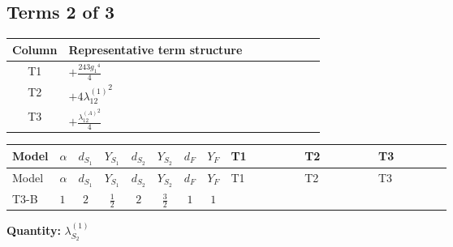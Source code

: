 \documentclass[8pt]{article}
\begin{document}
\begin{landscape}
\subsection*{Terms 2 of 3}
\begin{center}
\begin{tabular}{@{}c >{\raggedright\arraybackslash}p{0.82\linewidth}@{}}
\toprule
Column & Representative term structure \\
\midrule
T1 & \(\displaystyle +\frac{243 {g_1}^4}{4}\) \\
\midrule
T2 & \(\displaystyle +4 {\lambda_{12}^{(1)}}^2\) \\
\midrule
T3 & \(\displaystyle +\frac{{\lambda_{12}^{(A)}}^2}{4}\) \\
\midrule
\bottomrule
\end{tabular}
\end{center}
\smallskip
\tiny
\begin{longtable}{@{}llcccccc >{\raggedright\arraybackslash}p{0.21\linewidth} >{\raggedright\arraybackslash}p{0.21\linewidth} >{\raggedright\arraybackslash}p{0.21\linewidth}@{}}
\toprule
Model & $\alpha$ & $d_{S_1}$ & $Y_{S_1}$ & $d_{S_2}$ & $Y_{S_2}$ & $d_F$ & $Y_F$ & T1 & T2 & T3 \\
\midrule
\endfirsthead
\toprule
Model & $\alpha$ & $d_{S_1}$ & $Y_{S_1}$ & $d_{S_2}$ & $Y_{S_2}$ & $d_F$ & $Y_F$ & T1 & T2 & T3 \\
\midrule
\endhead
T3-B & $1$ & $2$ & $\frac{1}{2}$ & $2$ & $\frac{3}{2}$ & $1$ & $1$ & \scriptsize\adjustbox{max width=\linewidth}{$\begin{gathered} +\frac{243 {g_1}^4}{4}\end{gathered}$} & \scriptsize\adjustbox{max width=\linewidth}{$\begin{gathered} +4 {\lambda_{12}^{(1)}}^2\end{gathered}$} & \scriptsize\adjustbox{max width=\linewidth}{$\begin{gathered} +\frac{{\lambda_{12}^{(A)}}^2}{4}\end{gathered}$} \\
\midrule
\bottomrule
\end{longtable}
\clearpage
\noindent\textbf{Quantity: }$\lambda_{S_2}^{(1)}$\par\smallskip

\end{landscape}
\end{document}
